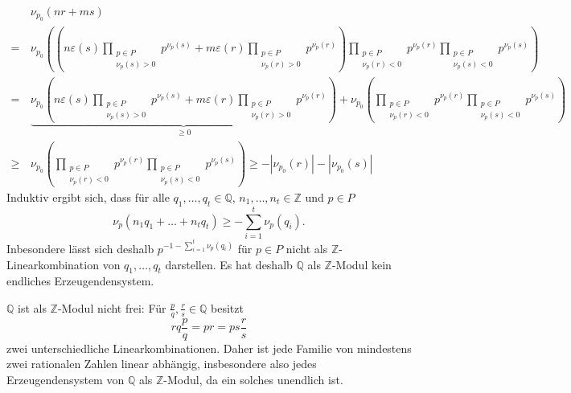 \documentclass[a4paper,10pt]{article}
\theoremstyle{definition}
\newcommand{\Z}{\mathbb{Z}}
\newcommand{\Q}{\mathbb{Q}}
\begin{document}
\begin{align*}
  &\, \nu_{p_0}( n r + m s ) \\
 =&\, \nu_{p_0} \left( \left( n \varepsilon(s) \prod_{\substack{p \in P \\ \nu_p(s) > 0}} p^{\nu_p(s)}
                            + m \varepsilon(r) \prod_{\substack{p \in P \\ \nu_p(r) > 0}} p^{\nu_p(r)}
               \right)
               \prod_{\substack{p \in P \\ \nu_p(r) < 0}} p^{\nu_p(r)} \prod_{\substack{p \in P \\ \nu_p(s) < 0}} p^{\nu_p(s)} \right) \\
 =&\, \underbrace{\nu_{p_0}\left(n \varepsilon(s) \prod_{\substack{p \in P \\ \nu_p(s) > 0}} p^{\nu_p(s)}
                               + m \varepsilon(r) \prod_{\substack{p \in P \\ \nu_p(r) > 0}} p^{\nu_p(r)}\right) }_{\geq 0}
   +\nu_{p_0}\left(\prod_{\substack{p \in P \\ \nu_p(r) < 0}} p^{\nu_p(r)} \prod_{\substack{p \in P \\ \nu_p(s) < 0}} p^{\nu_p(s)}\right) \\
 \geq&\, \nu_{p_0}\left(\prod_{\substack{p \in P \\ \nu_p(r) < 0}} p^{\nu_p(r)} \prod_{\substack{p \in P \\ \nu_p(s) < 0}} p^{\nu_p(s)}\right) \geq -|\nu_{p_0}(r)|-|\nu_{p_0}(s)|
\end{align*}
Induktiv ergibt sich, dass für alle $q_1, \ldots, q_t \in \Q$, $n_1, \ldots, n_t \in \Z$ und $p \in P$
\[
 \nu_p( n_1 q_1 + \ldots + n_t q_t ) \geq -\sum_{i=1}^t \nu_p(q_i).
\]
Inbesondere lässt sich deshalb $p^{-1-\sum_{i=1}^t \nu_p(q_i)}$ für $p \in P$ nicht als $\Z$-Linearkombination von $q_1, \ldots, q_t$ darstellen. Es hat deshalb $\Q$ als $\Z$-Modul kein endliches Erzeugendensystem.

$\Q$ ist als $\Z$-Modul nicht frei: Für $\frac{p}{q}, \frac{r}{s} \in \Q$ besitzt
\[
 rq \frac{p}{q} = pr = ps \frac{r}{s}
\]
zwei unterschiedliche Linearkombinationen. Daher ist jede Familie von mindestens zwei rationalen Zahlen linear abhängig, insbesondere also jedes Erzeugendensystem von $\Q$ als $\Z$-Modul, da ein solches unendlich ist.





\section{}
\end{document}
